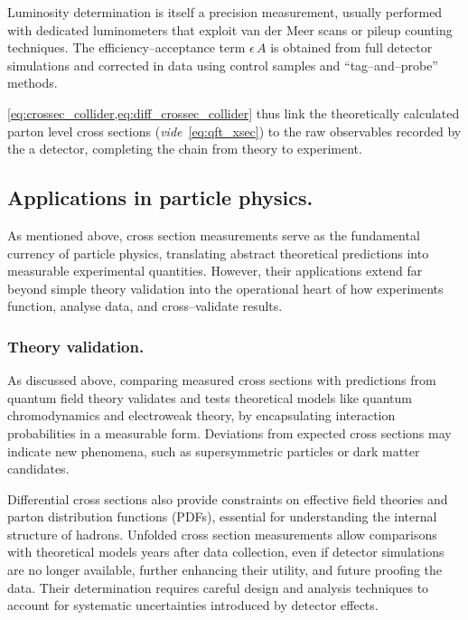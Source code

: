 \begin{definition}
        Luminosity determination is itself a precision measurement, usually performed with dedicated luminometers that exploit van der Meer scans or pileup counting techniques.
        The efficiency--acceptance term \(\epsilon\,A\) is obtained from full detector simulations and corrected in data using control samples and ``tag--and--probe'' methods.

        \cref{eq:crossec_collider,eq:diff_crossec_collider} thus link the theoretically calculated parton level cross sections (\textit{vide}~\cref{eq:qft_xsec}) to the raw observables recorded by the a detector, completing the chain from theory to experiment.

    \subsection{Applications in particle physics.}
        As mentioned above, cross section measurements serve as the fundamental currency of particle physics, translating abstract theoretical predictions into measurable experimental quantities.
        However, their applications extend far beyond simple theory validation into the operational heart of how experiments function, analyse data, and cross--validate results.
        \subsubsection{Theory validation.}
            As discussed above, comparing measured cross sections with predictions from quantum field theory validates and tests theoretical models like quantum chromodynamics and electroweak theory, by encapsulating interaction probabilities in a measurable form.
            Deviations from expected cross sections may indicate new phenomena, such as supersymmetric particles or dark matter candidates.
            
            Differential cross sections also provide constraints on effective field theories and parton distribution functions (PDFs), essential for understanding the internal structure of hadrons.
            Unfolded cross section measurements allow comparisons with theoretical models years after data collection, even if detector simulations are no longer available, further enhancing their utility, and future proofing the data.
            Their determination requires careful design and analysis techniques to account for systematic uncertainties introduced by detector effects.


\end{definition}
